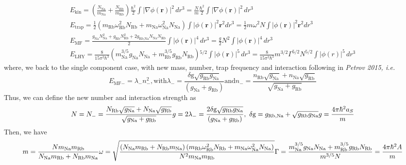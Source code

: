 \begin{equation}
\begin{split}
E_{\text{kin}}=\left(\frac{N_{\text{Na}}}{m_{\text{Na}}} +\frac{N_{\text{Rb}}}{m_{\text{Rb}}}\right)\frac{\hbar ^2}{2}\int \left| \nabla \phi (\pmb{r})\right|
^2 \, dr^3=\frac{N}{m} \frac{\hbar ^2}{2}\int \left| \nabla \phi (\pmb{r})\right| ^2 \, dr^3\\
E_{\text{trap}}=\frac{1}{2}\left(m_{\text{Rb}} \omega _{\text{Rb}}^2N_{\text{Rb}}+m_{\text{Na}} \omega _{\text{Na}}^2N_{\text{Na}}\right)\int \left|
\phi (\pmb{r})\right| ^2\pmb{r}^2dr^3=\frac{1}{2}m \omega ^2N\int \left| \phi (\pmb{r})\right| ^2\pmb{r}^2dr^3\\
E_{\text{MF}}=\frac{g_{\text{Na}}N_{\text{Na}}^2+g_{\text{Rb}}N_{\text{Rb}}^2+2g_{\text{Rb},\text{Na}}N_{\text{Na}}N_{\text{Rb}}}{2}\int \left| \phi
(\pmb{r})\right| ^4 \, dr^3=\frac{g}{2}N^2\int \left| \phi (\pmb{r})\right| ^4 \, dr^3\\
E_{\text{LHY}}=\frac{8}{15\pi ^2\hbar ^3}\left(m_{\text{Na}}^{3/5}g_{\text{Na}}N_{\text{Na}}+m_{\text{Rb}}^{3/5}g_{\text{Rb}}N_{\text{Rb}}\right){}^{5/2}\int
\left| \phi (\pmb{r})\right| ^5 \, dr^3=\frac{8}{15\pi ^2\hbar ^3}m^{3/2}\Gamma ^{5/2}N^{5/2}\int \left| \phi (r)\right| ^5 \, dr^3
\end{split}
\end{equation}
where, we back to the single component case, with new mass, number, trap frequency and interaction following  in \textit{Petrov 2015, i.e.}
\begin{equation}
E_{\text{MF}-}=\lambda _-n_-^2, \text{with} \lambda _-=\frac{\text{$\delta$g}\sqrt{g_{\text{Rb}}g_{\text{Na}}}}{\left(g_{\text{Na}}+g_{\text{Rb}}\right)}\text{and} n_-=\frac{n_{\text{Rb}}\sqrt{g_{\text{Na}}}+n_{\text{Na}}\sqrt{g_{\text{Rb}}}}{\sqrt{g_{\text{Na}}+g_{\text{Rb}}}}
\end{equation}
Thus, we can define the new number and interaction strength as
\begin{equation}
N=N_-=\frac{N_{\text{Rb}}\sqrt{g_{\text{Na}}}+N_{\text{Na}}\sqrt{g_{\text{Rb}}}}{\sqrt{g_{\text{Na}}+g_{\text{Rb}}}}\\
g=2\lambda _-=\frac{2\text{$\delta $g}\sqrt{g_{\text{Rb}}g_{\text{Na}}}}{\left(g_{\text{Na}}+g_{\text{Rb}}\right)},\text{  }\text{$\delta $g}=g_{\text{Rb},\text{Na}}+\sqrt{g_{\text{Rb}}g_{\text{Na}}}\\
g=\frac{4\pi  \hbar ^2a_S}{m}
\end{equation}
Then, we have
\begin{equation}
m=\frac{N m_{\text{Na}}m_{\text{Rb}}}{N_{\text{Na}}m_{\text{Rb}}+N_{\text{Rb}}m_{\text{Na}}}\\
\omega =\sqrt{\frac{\left(N_{\text{Na}}m_{\text{Rb}}+N_{\text{Rb}}m_{\text{Na}}\right)\left(m_{\text{Rb}} \omega _{\text{Rb}}^2N_{\text{Rb}}+m_{\text{Na}}
\omega _{\text{Na}}^2N_{\text{Na}}\right)}{N^2m_{\text{Na}}m_{\text{Rb}}}}\\
\Gamma =\frac{m_{\text{Na}}^{3/5}g_{\text{Na}}N_{\text{Na}}+m_{\text{Rb}}^{3/5}g_{\text{Rb}}N_{\text{Rb}}}{m^{3/5}N}=\frac{4\pi  \hbar ^2A}{m}
\end{equation}
